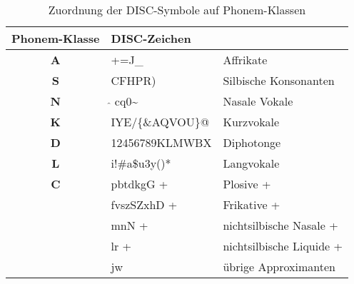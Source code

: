 \begin{table}[h]
    \centering
    \caption{Zuordnung der DISC-Symbole auf Phonem-Klassen}
    \label{table:phoncats}
    \begin{tabular}{|c|l|l|}
    \hline
    {\bf Phonem-Klasse} & {\bf DISC-Zeichen}     & ~                         \\ \hline
    {\bf A}             & +=J\_            & Affrikate                 \\ \hline
    {\bf S}             & CFHPR)           & Silbische Konsonanten     \\ \hline
    {\bf N}             & $\hat{}$ cq0\~          & Nasale Vokale             \\ \hline
    {\bf K}             & IYE/\{\&AQVOU\}@ & Kurzvokale                \\ \hline
    {\bf D}             & 12456789KLMWBX   & Diphotonge                \\ \hline
    {\bf L}             & i!\#a\$u3y()*    & Langvokale                \\ \hline
    {\bf C}             & pbtdkgG +        & Plosive +                 \\
    ~             & fvszSZxhD +      & Frikative +               \\
    ~             &  mnN +           & nichtsilbische Nasale +   \\
    ~             & lr +             & nichtsilbische Liquide +  \\
    ~             & jw               & übrige Approximanten      \\ \hline
    \end{tabular}
\end{table}